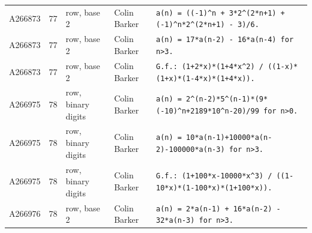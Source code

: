 \documentclass[11pt]{article}
\theoremstyle{definition}
\theoremstyle{remark}
\begin{document}
{\begin{longtable}{p{1.3cm}p{0.7cm}p{2.4cm}p{2.3cm}p{7.3cm}}
A266873 & 77 & row, base 2 & Colin Barker & \texttt{a(n)\allowbreak{} \allowbreak{}=\allowbreak{} \allowbreak{}((-\allowbreak{}1)\allowbreak{}\^{}n \allowbreak{}+\allowbreak{} \allowbreak{}3*\allowbreak{}2\^{}(2*\allowbreak{}n+\allowbreak{}1)\allowbreak{} \allowbreak{}+\allowbreak{} \allowbreak{}(-\allowbreak{}1)\allowbreak{}\^{}n*\allowbreak{}2\^{}(2*\allowbreak{}n+\allowbreak{}1)\allowbreak{} \allowbreak{}-\allowbreak{} \allowbreak{}3)\allowbreak{}/\allowbreak{}6.} \\
A266873 & 77 & row, base 2 & Colin Barker & \texttt{a(n)\allowbreak{} \allowbreak{}=\allowbreak{} \allowbreak{}17*\allowbreak{}a(n-\allowbreak{}2)\allowbreak{} \allowbreak{}-\allowbreak{} \allowbreak{}16*\allowbreak{}a(n-\allowbreak{}4)\allowbreak{} \allowbreak{}for \allowbreak{}n>3.} \\
A266873 & 77 & row, base 2 & Colin Barker & \texttt{G.f.: \allowbreak{}(1+\allowbreak{}2*\allowbreak{}x)\allowbreak{}*\allowbreak{}(1+\allowbreak{}4*\allowbreak{}x\^{}2)\allowbreak{} \allowbreak{}/\allowbreak{} \allowbreak{}((1-\allowbreak{}x)\allowbreak{}*\allowbreak{}(1+\allowbreak{}x)\allowbreak{}*\allowbreak{}(1-\allowbreak{}4*\allowbreak{}x)\allowbreak{}*\allowbreak{}(1+\allowbreak{}4*\allowbreak{}x)\allowbreak{})\allowbreak{}.} \\
A266975 & 78 & row, binary digits & Colin Barker & \texttt{a(n)\allowbreak{} \allowbreak{}=\allowbreak{} \allowbreak{}2\^{}(n-\allowbreak{}2)\allowbreak{}*\allowbreak{}5\^{}(n-\allowbreak{}1)\allowbreak{}*\allowbreak{}(9*\allowbreak{}(-\allowbreak{}10)\allowbreak{}\^{}n+\allowbreak{}2189*\allowbreak{}10\^{}n-\allowbreak{}20)\allowbreak{}/\allowbreak{}99 \allowbreak{}for \allowbreak{}n>0.} \\
A266975 & 78 & row, binary digits & Colin Barker & \texttt{a(n)\allowbreak{} \allowbreak{}=\allowbreak{} \allowbreak{}10*\allowbreak{}a(n-\allowbreak{}1)\allowbreak{}+\allowbreak{}10000*\allowbreak{}a(n-\allowbreak{}2)\allowbreak{}-\allowbreak{}100000*\allowbreak{}a(n-\allowbreak{}3)\allowbreak{} \allowbreak{}for \allowbreak{}n>3.} \\
A266975 & 78 & row, binary digits & Colin Barker & \texttt{G.f.: \allowbreak{}(1+\allowbreak{}100*\allowbreak{}x-\allowbreak{}10000*\allowbreak{}x\^{}3)\allowbreak{} \allowbreak{}/\allowbreak{} \allowbreak{}((1-\allowbreak{}10*\allowbreak{}x)\allowbreak{}*\allowbreak{}(1-\allowbreak{}100*\allowbreak{}x)\allowbreak{}*\allowbreak{}(1+\allowbreak{}100*\allowbreak{}x)\allowbreak{})\allowbreak{}.} \\
A266976 & 78 & row, base 2 & Colin Barker & \texttt{a(n)\allowbreak{} \allowbreak{}=\allowbreak{} \allowbreak{}2*\allowbreak{}a(n-\allowbreak{}1)\allowbreak{} \allowbreak{}+\allowbreak{} \allowbreak{}16*\allowbreak{}a(n-\allowbreak{}2)\allowbreak{} \allowbreak{}-\allowbreak{} \allowbreak{}32*\allowbreak{}a(n-\allowbreak{}3)\allowbreak{} \allowbreak{}for \allowbreak{}n>3.} \\

\end{longtable}}
\end{document}

